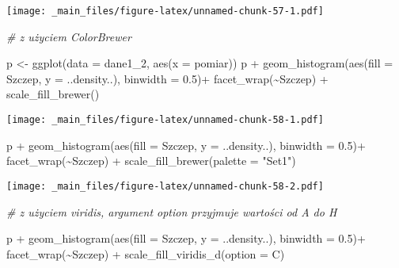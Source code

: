\documentclass[
]{book}
\newenvironment{Shaded}{\begin{snugshade}}{\end{snugshade}}
\newcommand{\AttributeTok}[1]{\textcolor[rgb]{0.77,0.63,0.00}{#1}}
\newcommand{\CommentTok}[1]{\textcolor[rgb]{0.56,0.35,0.01}{\textit{#1}}}
\newcommand{\FloatTok}[1]{\textcolor[rgb]{0.00,0.00,0.81}{#1}}
\newcommand{\FunctionTok}[1]{\textcolor[rgb]{0.00,0.00,0.00}{#1}}
\newcommand{\NormalTok}[1]{#1}
\newcommand{\OtherTok}[1]{\textcolor[rgb]{0.56,0.35,0.01}{#1}}
\newcommand{\SpecialCharTok}[1]{\textcolor[rgb]{0.00,0.00,0.00}{#1}}
\newcommand{\StringTok}[1]{\textcolor[rgb]{0.31,0.60,0.02}{#1}}
\begin{document}
\texttt{[image: \_main\_files/figure-latex/unnamed-chunk-57-1.pdf]}

\begin{Shaded}
\begin{Highlighting}[]
\CommentTok{\# z użyciem ColorBrewer}

\NormalTok{p }\OtherTok{\textless{}{-}} \FunctionTok{ggplot}\NormalTok{(}\AttributeTok{data =}\NormalTok{ dane1\_2, }\FunctionTok{aes}\NormalTok{(}\AttributeTok{x =}\NormalTok{ pomiar))}
\NormalTok{p }\SpecialCharTok{+} \FunctionTok{geom\_histogram}\NormalTok{(}\FunctionTok{aes}\NormalTok{(}\AttributeTok{fill =}\NormalTok{ Szczep, }\AttributeTok{y =}\NormalTok{ ..density..), }\AttributeTok{binwidth =} \FloatTok{0.5}\NormalTok{)}\SpecialCharTok{+}
  \FunctionTok{facet\_wrap}\NormalTok{(}\SpecialCharTok{\textasciitilde{}}\NormalTok{Szczep) }\SpecialCharTok{+} \FunctionTok{scale\_fill\_brewer}\NormalTok{()}
\end{Highlighting}
\end{Shaded}

\texttt{[image: \_main\_files/figure-latex/unnamed-chunk-58-1.pdf]}

\begin{Shaded}
\begin{Highlighting}[]
\NormalTok{p }\SpecialCharTok{+} \FunctionTok{geom\_histogram}\NormalTok{(}\FunctionTok{aes}\NormalTok{(}\AttributeTok{fill =}\NormalTok{ Szczep, }\AttributeTok{y =}\NormalTok{ ..density..), }\AttributeTok{binwidth =} \FloatTok{0.5}\NormalTok{)}\SpecialCharTok{+}
  \FunctionTok{facet\_wrap}\NormalTok{(}\SpecialCharTok{\textasciitilde{}}\NormalTok{Szczep) }\SpecialCharTok{+} \FunctionTok{scale\_fill\_brewer}\NormalTok{(}\AttributeTok{palette =} \StringTok{"Set1"}\NormalTok{)}
\end{Highlighting}
\end{Shaded}

\texttt{[image: \_main\_files/figure-latex/unnamed-chunk-58-2.pdf]}

\begin{Shaded}
\begin{Highlighting}[]
\CommentTok{\# z użyciem viridis, argument option przyjmuje wartości od A do H}

\NormalTok{p }\SpecialCharTok{+} \FunctionTok{geom\_histogram}\NormalTok{(}\FunctionTok{aes}\NormalTok{(}\AttributeTok{fill =}\NormalTok{ Szczep, }\AttributeTok{y =}\NormalTok{ ..density..), }\AttributeTok{binwidth =} \FloatTok{0.5}\NormalTok{)}\SpecialCharTok{+}
  \FunctionTok{facet\_wrap}\NormalTok{(}\SpecialCharTok{\textasciitilde{}}\NormalTok{Szczep) }\SpecialCharTok{+} \FunctionTok{scale\_fill\_viridis\_d}\NormalTok{(}\AttributeTok{option =} \StringTok{\textquotesingle{}C\textquotesingle{}}\NormalTok{)}
\end{Highlighting}
\end{Shaded}
\end{document}
